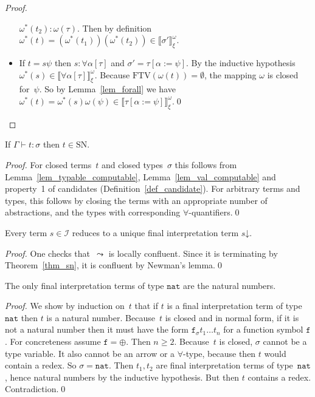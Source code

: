 \documentclass[runningheads,a4paper]{llncs}
\newcommand{\Iterms}{\mathcal{I}}
\newcommand{\subst}[2]{#1:=#2}
\newcommand{\FTV}{\mathrm{FTV}}
\newcommand{\nat}{\mathtt{nat}}
\newcommand{\da}{\mathord{\downarrow}}
\newcommand{\SN}{\mathrm{SN}}
\newcommand{\val}[3]{\ensuremath{\llbracket#1\rrbracket_{#2}^{#3}}}
\newcommand{\proves}{\vdash}
\begin{document}
\begin{proof}
\begin{itemize}
    $\omega^*(t_2) : \omega(\tau)$. Then by definition
    $\omega^*(t) = (\omega^*(t_1))(\omega^*(t_2)) \in
    \val{\sigma'}{\xi}{\omega}$.
  \item If $t = s \psi$ then $s : \forall\alpha[\tau]$ and $\sigma' =
    \tau[\subst{\alpha}{\psi}]$. By the inductive hypothesis
    $\omega^*(s) \in \val{\forall\alpha[\tau]}{\xi}{\omega}$. Because
    $\FTV(\omega(t)) = \emptyset$, the mapping $\omega$ is closed
    for~$\psi$. So by Lemma~\ref{lem_forall} we have $\omega^*(t) =
    \omega^*(s) \omega(\psi) \in
    \val{\tau[\subst{\alpha}{\psi}]}{\xi}{\omega}$.\qed
  \end{itemize}
\end{proof}

\begin{theorem}\label{thm_sn}
  If $\Gamma \proves t : \sigma$ then $t \in \SN$.
\end{theorem}

\begin{proof}
  For closed terms~$t$ and closed types~$\sigma$ this follows from
  Lemma~\ref{lem_typable_computable}, Lemma~\ref{lem_val_computable}
  and property~1 of candidates (Definition~\ref{def_candidate}). For
  arbitrary terms and types, this follows by closing the terms with an
  appropriate number of abstractions, and the types with corresponding
  $\forall$-quantifiers.\qed
\end{proof}

\begin{lemma}\label{lem_unique_final}
  Every term $s \in \Iterms$ reduces to a unique final interpretation
  term $s\da$.
\end{lemma}

\begin{proof}
  One checks that~$\leadsto$ is locally confluent. Since it is
  terminating by Theorem~\ref{thm_sn}, it is confluent by Newman's
  lemma.\qed
\end{proof}

\begin{lemma}\label{lem_final_nat}
  The only final interpretation terms of type $\nat$ are the natural
  numbers.
\end{lemma}

\begin{proof}
  We show by induction on~$t$ that if $t$ is a final interpretation
  term of type~$\nat$ then $t$ is a natural number. Because~$t$ is
  closed and in normal form, if it is not a natural number then it
  must have the form $\mathtt{f}_\sigma t_1 \ldots t_n$ for a function
  symbol $\mathtt{f}$. For concreteness assume $\mathtt{f} =
  \oplus$. Then $n \ge 2$. Because~$t$ is closed, $\sigma$ cannot be a
  type variable. It also cannot be an arrow or a $\forall$-type,
  because then $t$ would contain a redex. So $\sigma=\nat$. Then
  $t_1,t_2$ are final interpretation terms of type~$\nat$, hence
  natural numbers by the inductive hypothesis. But then $t$ contains a
  redex. Contradiction.\qed
\end{proof}
\end{document}
